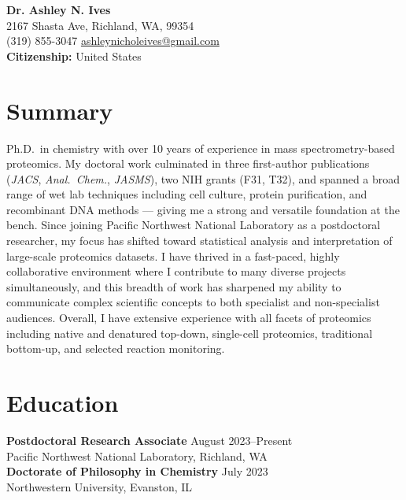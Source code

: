 \documentclass[10pt, letterpaper]{article}
\begin{document}
\begin{center}
  {\LARGE \textbf{Dr. Ashley N. Ives}} \\[4pt]
  2167 Shasta Ave, Richland, WA, 99354 \\
  (319) 855-3047 \quad \href{mailto:ashleynicholeives@gmail.com}{ashleynicholeives@gmail.com} \\[2pt]
  \textbf{Citizenship:} United States
\end{center}

\section{Summary}

Ph.D.\ in chemistry with over 10 years of experience in mass spectrometry-based proteomics. My doctoral
work culminated in three first-author publications (\textit{JACS}, \textit{Anal.\ Chem.}, \textit{JASMS}),
two NIH grants (F31, T32), and spanned a broad range of wet lab techniques including cell culture, protein
purification, and recombinant DNA methods --- giving me a strong and versatile foundation at the bench.
Since joining Pacific Northwest National Laboratory as a postdoctoral researcher, my focus has shifted
toward statistical analysis and interpretation of large-scale proteomics datasets. I have thrived in a
fast-paced, highly collaborative environment where I contribute to many diverse projects simultaneously,
and this breadth of work has sharpened my ability to communicate complex scientific concepts to both
specialist and non-specialist audiences. Overall, I have extensive experience with all facets of proteomics
including native and denatured top-down, single-cell proteomics, traditional bottom-up, and selected
reaction monitoring.

\section{Education}

\textbf{Postdoctoral Research Associate} \hfill August 2023--Present \\
Pacific Northwest National Laboratory, Richland, WA \\[4pt]

\textbf{Doctorate of Philosophy in Chemistry} \hfill July 2023 \\
Northwestern University, Evanston, IL \\[4pt]
\end{document}

